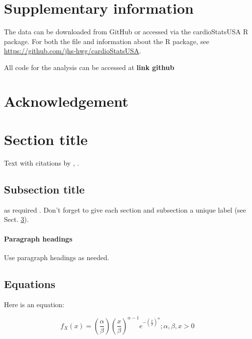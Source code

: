 \documentclass[useAMS,usenatbib,referee]{biom}
\begin{document}
\hypertarget{supplement}{%
\section{Supplementary information}\label{supplement}}

The data can be downloaded from GitHub or accessed via the
cardioStatsUSA R package. For both the file and information about the R
package, see \url{https://github.com/jhs-hwg/cardioStatsUSA}.

All code for the analysis can be accessed at \textbf{link github}

\hypertarget{acknowledge}{%
\section{Acknowledgement}\label{acknowledge}}

\hypertarget{sec:1}{%
\section{Section title}\label{sec:1}}

Text with citations by \citet{heagerty2000time},
\citep{pepe2003statistical}.

\hypertarget{sec:2}{%
\subsection{Subsection title}\label{sec:2}}

as required \citep{hoerl1970ridge, zou2005regularization}. Don't forget
to give each section and subsection a unique label (see Sect.
\ref{sec:1}).

\hypertarget{paragraph-headings}{%
\paragraph{Paragraph headings}\label{paragraph-headings}}

Use paragraph headings as needed.

\hypertarget{equations}{%
\subsection{Equations}\label{equations}}

Here is an equation:

\[ f_{X}(x) = \left(\frac{\alpha}{\beta}\right)\left(\frac{x}{\beta}\right)^{\alpha-1}e^{-\left(\frac{x}{\beta}\right)^{\alpha}}; \alpha,\beta,x > 0 \]
\end{document}
